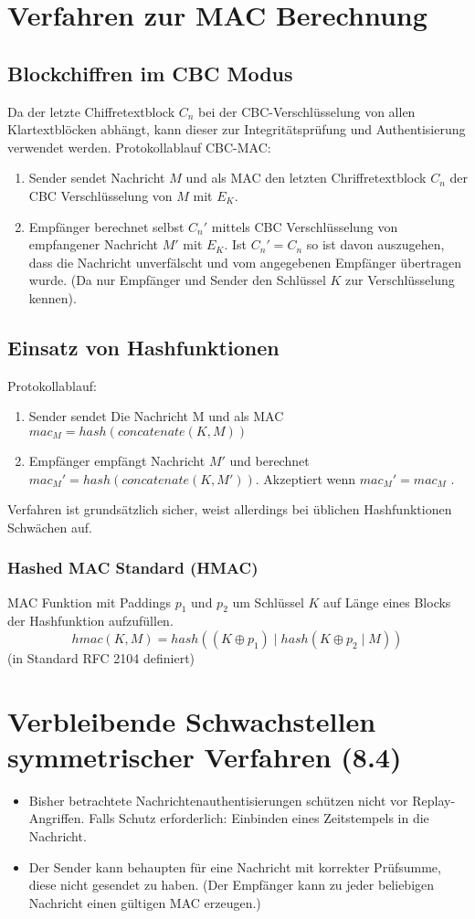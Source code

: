 \section{Verfahren zur MAC Berechnung}
\subsection{Blockchiffren im CBC Modus}
Da der letzte Chiffretextblock $C_n$ bei der CBC-Verschlüsselung von allen Klartextblöcken abhängt, kann dieser zur Integritätsprüfung und Authentisierung verwendet werden. Protokollablauf CBC-MAC:
\begin{enumerate}
  \item Sender sendet Nachricht $M$ und als MAC den letzten Chriffretextblock $C_n$ der CBC Verschlüsselung von $M$ mit $E_K$.
  \item Empfänger berechnet selbst $C_n'$ mittels CBC Verschlüsselung von empfangener Nachricht $M'$ mit $E_K$. Ist $C_n' = C_n$ so ist davon auszugehen, dass die Nachricht unverfälscht und vom angegebenen Empfänger übertragen wurde. (Da nur Empfänger und Sender den Schlüssel $K$ zur Verschlüsselung kennen). 
\end{enumerate}

\subsection{Einsatz von Hashfunktionen}
Protokollablauf:
\begin{enumerate}
  \item Sender sendet Die Nachricht M und als MAC $mac_M = hash(concatenate(K, M))$
  \item Empfänger empfängt Nachricht $M'$ und berechnet $mac_M' = hash(concatenate(K, M'))$. Akzeptiert wenn $mac_M' = mac_M$ .
\end{enumerate}
Verfahren ist grundsätzlich sicher, weist allerdings bei üblichen Hashfunktionen Schwächen auf.

\subsubsection*{Hashed MAC Standard (HMAC)}
MAC Funktion mit Paddings $p_1$ und $p_2$ um Schlüssel $K$ auf Länge eines Blocks der Hashfunktion aufzufüllen.
  	$$hmac(K,M) = hash((K \oplus p_1) \mid hash(K \oplus p_2 \mid M))$$
(in Standard RFC 2104 definiert)

\section{Verbleibende Schwachstellen symmetrischer Verfahren (8.4)}
\begin{itemize}
  \item Bisher betrachtete Nachrichtenauthentisierungen schützen nicht vor Replay-Angriffen. Falls Schutz erforderlich: Einbinden eines Zeitstempels in die Nachricht.
  \item Der Sender kann behaupten für eine Nachricht mit korrekter Prüfsumme, diese nicht gesendet zu haben. (Der Empfänger kann zu jeder beliebigen Nachricht einen gültigen MAC erzeugen.) 
\end{itemize}